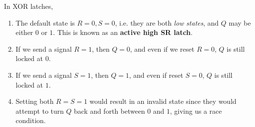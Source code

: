   \begin{theorem}
    In XOR latches, 
    \begin{enumerate}
      \item The default state is $R = 0, S = 0$, i.e. they are both \textit{low states}, and $Q$ may be either $0$ or $1$. This is known as an \textbf{active high SR latch}. 
      \item If we send a signal $R = 1$, then $Q = 0$, and even if we reset $R = 0$, $Q$ is still locked at $0$. 
      \item If we send a signal $S = 1$, then $Q = 1$, and even if reset $S = 0$, $Q$ is still locked at $1$. 
      \item Setting both $R = S = 1$ would result in an invalid state since they would attempt to turn $Q$ back and forth between $0$ and $1$, giving us a race condition. 
    \end{enumerate}

    \begin{figure}[H]
      \centering
      \begin{subfigure}[b]{0.48\textwidth}
        \centering
\end{subfigure}
\end{figure}
\end{theorem}
